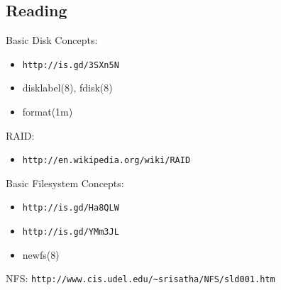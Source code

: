 \documentclass[xga]{xdvislides}
\begin{document}
\subsection{Reading}
Basic Disk Concepts:
\begin{itemize}
	\item \verb+http://is.gd/3SXn5N+
	\item disklabel(8), fdisk(8)
	\item format(1m)
\end{itemize}
RAID:
\begin{itemize}
	\item \verb+http://en.wikipedia.org/wiki/RAID+
\end{itemize}
Basic Filesystem Concepts:
\begin{itemize}
	\item \verb+http://is.gd/Ha8QLW+
	\item \verb+http://is.gd/YMm3JL+
	\item newfs(8)
\end{itemize}
NFS: \verb+http://www.cis.udel.edu/~srisatha/NFS/sld001.htm+
\end{document}
